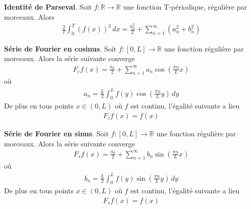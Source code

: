 \begin{myTheorem}
	\textbf{Identité de Parseval}. Soit $f:\mathbb{R}\rightarrow\mathbb{R}$ une fonction T-périodique, régulière par morceaux. Alors
	\begin{eqnarray}
		\frac{2}{T}\int_0^T(f(x))^2\,dx=\frac{a_0^2}{2}+\sum_{n=1}^\infty(a_n^2+b_n^2)
	\end{eqnarray}
\end{myTheorem}

\textbf{Série de Fourier en cosinus}. Soit $f:[0,L]\rightarrow\mathbb{R}$ une fonction régulière par morceaux. Alors la série suivante converge
\begin{eqnarray}
	F_cf(x)=\frac{a_0}{2}+\sum_{n=1}^\infty a_n\cos(\frac{\pi n}{L}x)
\end{eqnarray}
où
\begin{eqnarray}
	a_n=\frac{L}{2}\int_0^Lf(y)\cos(\frac{\pi n}{L}y)\,dy
\end{eqnarray}
De plus en tous points $x\in (0,L)$ où $f$ est continu, l'égalité suivante a lieu
\begin{eqnarray}
	F_cf(x)=f(x)
\end{eqnarray}

\textbf{Série de Fourier en sinus}. Soit $f:[0,L]\rightarrow\mathbb{R}$ une fonction régulière par morceaux. Alors la série suivante converge
\begin{eqnarray}
	F_sf(x)=\frac{a_0}{2}+\sum_{n=1}^\infty b_n\sin(\frac{\pi n}{L}x)
\end{eqnarray}
où
\begin{eqnarray}
	b_n=\frac{L}{2}\int_0^Lf(y)\sin(\frac{\pi n}{L}y)\,dy
\end{eqnarray}
De plus en tous points $x\in (0,L)$ où $f$ est continu, l'égalité suivante a lieu
\begin{eqnarray}
	F_sf(x)=f(x)
\end{eqnarray}